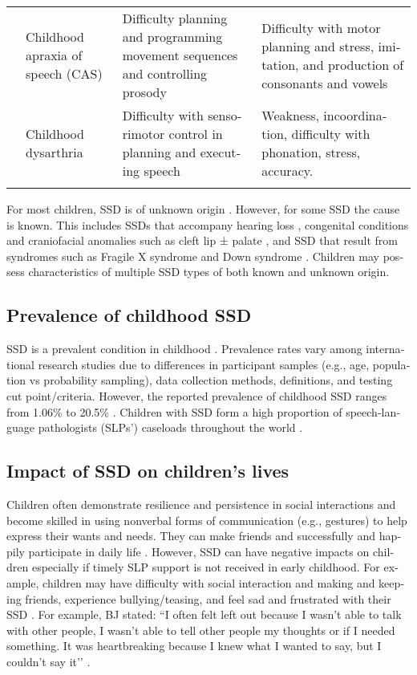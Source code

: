 \documentclass[output=paper,colorlinks,citecolor=brown]{langscibook}
\begin{document}
\begin{otherlanguage}{english}
\begin{tableeng}
\begin{tabularx}{\textwidth}{QQQQ}
\tablevspace
& Childhood apraxia of speech (CAS)&	Difficulty
{planning} and
{programming}
{movement} sequences and controlling prosody	&Difficulty with motor
{planning} and stress,
{imitation}, and production of consonants and vowels\\%
\tablevspace
& Childhood dysarthria&	Difficulty with sensorimotor
control in planning and executing speech &	Weakness,
incoordination, difficulty with phonation, stress, accuracy. \\
\lspbottomrule
    \end{tabularx}
    \label{tab:cap1tab1}
\end{tableeng}


For most children, SSD is of unknown origin \citep{Shriberg2005}. However, for some SSD the cause is known. This includes SSDs that accompany hearing loss \citep{Crowe2014}, congenital conditions and craniofacial anomalies such as cleft lip ± palate \citep{Cronin2019}, and SSD that result from syndromes such as Fragile X syndrome and Down syndrome \citep{Barnes2009}. Children may possess characteristics of multiple SSD types of both known and unknown origin. 


\subsection*{Prevalence of childhood SSD}
SSD is a prevalent condition in childhood \citep{Law2000}. Prevalence rates vary among international research studies due to differences in participant samples (e.g., age, population vs probability sampling), data collection methods, definitions, and testing cut point/criteria. However, the reported prevalence of childhood SSD ranges from 1.06\% \citep{McKinnon2007} to 20.5\% \citep{Tuomi1977}. Children with SSD form a high proportion of speech-language pathologists (SLPs’) caseloads throughout the world \citep{Broomfield2004, Mullen2010, Oliveira2015}.


\subsection*{Impact of SSD on children’s lives}
Children often demonstrate resilience and persistence in social interactions and become skilled in using nonverbal forms of communication (e.g., gestures) to help express their wants and needs. They can make friends and successfully and happily participate in daily life \citep{McLeodBaker2017}. However, SSD can have negative impacts on children especially if timely SLP support is not received in early childhood. For example, children may have difficulty with social interaction and making and keeping friends, experience bullying/teasing, and feel sad and frustrated with their SSD \citep{McCormack2011, McLeod2013}. For example, BJ stated: “I often felt left out because I wasn’t able to talk with other people, I wasn’t able to tell other people my thoughts or if I needed something. It was heartbreaking because I knew what I wanted to say, but I couldn’t say it’’ \citep[46]{Carrigg2015}.


\end{otherlanguage}
\end{document}

